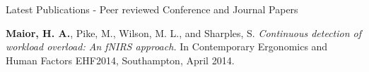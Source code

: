 \documentclass{resume} %
\begin{document}
\begin{rSection}{Latest Publications - Peer reviewed Conference and Journal Papers}
\item \textbf{Maior, H. A.}, Pike, M., Wilson, M. L., and Sharples, S. \emph{Continuous detection of workload overload: An fNIRS approach.} In Contemporary Ergonomics and Human Factors    EHF2014, Southampton, April 2014.


\end{rSection}
\vspace{-2 mm}
\end{document}
